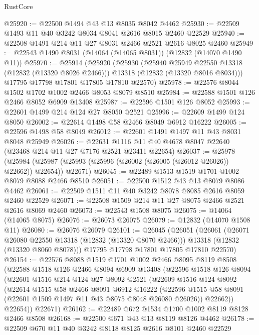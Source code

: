 \begin{lexlean}{RustCore}
\begin{coremodule}
@25920 := @22500 @1494 @43 @13 @8035 @8042 @4462
@25930 := @22509 @1493 @11 @40 @3242 @8034 @8041 @2616 @8015 @2460 @22529
@25940 := @22508 @1491 @214 @11 @27 @8031 @2466 @2521 @2616 @8025 @2460
@25949 := @22543 @1490 @8031 (@14064 (@14065 @8031)) (@12832 (@14070 @1490 @11))
@25970 := @25914
    (@25920
      (@25930
        (@25940 @25949 @22550 @13318 (@12832 (@13320 @8026 @2466)))
        @13318
        (@12832 (@13320 @8016 @8034)))
      @17795
      @17798
      @17801
      @17805
      @17810
      @22570)
@25978 := @22576 @8044 @1502 @1702 @1002 @2466 @8053 @8079 @8510
@25984 := @22588 @1501 @126 @2466 @8052 @6909 @13408
@25987 := @22596 @1501 @126 @8052
@25993 := @22601 @1499 @214 @124 @27 @8050 @2521
@25996 := @22609 @1499 @124 @8050
@26002 := @22614 @1498 @58 @2466 @8049 @6912 @16222
@26005 := @22596 @1498 @58 @8049
@26012 := @22601 @1491 @1497 @11 @43 @8031 @8048 @25949
@26026 := @22631 @1116 @11 @40 @4678 @8047 @22640 (@23468 @214 @11 @27 @7176 @2521 @23411 @22654)
@26037 := @25978
    (@25984 (@25987 (@25993 (@25996 (@26002 (@26005 (@26012 @26026)) @22662)) @22654)) @22671)
@26045 := @22489 @1513 @1519 @1701 @1002 @8079 @8088 @2466 @8510
@26051 := @22500 @1512 @43 @13 @8079 @8086 @4462
@26061 := @22509 @1511 @11 @40 @3242 @8078 @8085 @2616 @8059 @2460 @22529
@26071 := @22508 @1509 @214 @11 @27 @8075 @2466 @2521 @2616 @8069 @2460
@26073 := @22543 @1508 @8075
@26075 := @14064 (@14065 @8075)
@26076 := @26073 @26075
@26079 := @12832 (@14070 @1508 @11)
@26080 := @26076 @26079
@26101 := @26045
    (@26051
      (@26061
        (@26071 @26080 @22550 @13318 (@12832 (@13320 @8070 @2466)))
        @13318
        (@12832 (@13320 @8060 @8078)))
      @17795
      @17798
      @17801
      @17805
      @17810
      @22570)
@26154 := @22576
    @8088
    @1519
    @1701
    @1002
    @2466
    @8095
    @8119
    @8508
    (@22588
      @1518
      @126
      @2466
      @8094
      @6909
      @13408
      (@22596
        @1518
        @126
        @8094
        (@22601
          @1516
          @214
          @124
          @27
          @8092
          @2521
          (@22609
            @1516
            @124
            @8092
            (@22614
              @1515
              @58
              @2466
              @8091
              @6912
              @16222
              (@22596 @1515 @58 @8091 (@22601 @1509 @1497 @11 @43 @8075 @8048 @26080 @26026))
              @22662))
          @22654))
      @22671)
@26162 := @22489 @672 @1534 @1700 @1002 @8119 @8128 @2466 @8508
@26168 := @22500 @671 @43 @13 @8119 @8126 @4462
@26178 := @22509 @670 @11 @40 @3242 @8118 @8125 @2616 @8101 @2460 @22529

\end{coremodule}
\end{lexlean}
